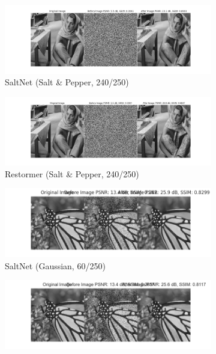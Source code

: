 \begin{figure}[htpb]
    \centering
    \begin{subfigure}{0.48\textwidth}
        \centering
        \includegraphics[width=\textwidth]{assets/240_sap_saltnet.png}
        \caption{SaltNet (Salt \& Pepper, 240/250)}
    \end{subfigure}
    \hfill
    \begin{subfigure}{0.48\textwidth}
        \centering
        \includegraphics[width=\textwidth]{assets/240_sap_restormer.png}
        \caption{Restormer (Salt \& Pepper, 240/250)}
    \end{subfigure}
    \begin{subfigure}{0.48\textwidth}
        \centering
        \includegraphics[width=\textwidth]{assets/60_gau_2_saltnet.png}
        \caption{SaltNet (Gaussian, 60/250)}
    \end{subfigure}
    \hfill
    \begin{subfigure}{0.48\textwidth}
        \centering
        \includegraphics[width=\textwidth]{assets/60_gau_2_restormer.png}

\end{subfigure}
\end{figure}
